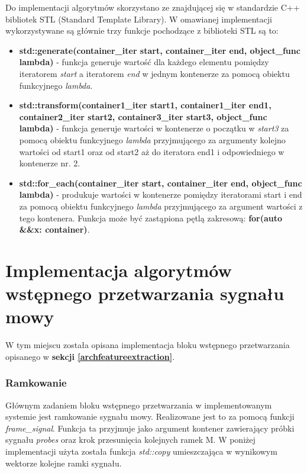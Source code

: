 Do implementacji algorytmów skorzystano ze znajdującej się w standardzie C++ bibliotek STL (Standard Template Library). W omawianej implementacji wykorzystywane są głównie trzy funkcje pochodzące z biblioteki STL są to:
\begin{itemize}
  \item{\textbf{std::generate(container\_iter start, container\_iter end, object\_func lambda)}} - funkcja generuje wartość dla każdego elementu pomiędzy iteratorem \textit{start} a iteratorem \textit{end} w jednym kontenerze za pomocą obiektu funkcyjnego \textit{lambda}.
  \item{\textbf{std::transform(container1\_iter start1, container1\_iter end1,
                       container2\_iter start2,
                       container3\_iter start3, object\_func lambda)}} 
  - funkcja generuje wartości w kontenerze o początku w \textit{start3} za pomocą obiektu funkcyjnego \textit{lambda} przyjmującego za argumenty kolejno wartości od start1 oraz od start2 aż do iteratora end1 i odpowiedniego w kontenerze nr. 2.
  \item{\textbf{std::for\_each(container\_iter start, container\_iter end, object\_func lambda)}} - produkuje wartości w kontenerze pomiędzy iteratorami start i end za pomocą obiektu funkcyjnego \textit{lambda} przyjmującego za argument wartości z tego kontenera. Funkcja może być zastąpiona pętlą zakresową: \textbf{for(auto \&\&x: container)}.

\end{itemize}

\section{Implementacja algorytmów wstępnego przetwarzania  sygnału mowy}

W tym miejscu została opisana implementacja bloku wstępnego przetwarzania opisanego w \textbf{sekcji \ref{archfeatureextraction}}.

\subsubsection{Ramkowanie}

Głównym zadaniem bloku wstępnego przetwarzania w implementowanym systemie jest ramkowanie sygnału mowy. Realizowane jest to za pomocą funkcji \textit{frame\_signal}. Funkcja ta przyjmuje jako argument kontener zawierający próbki sygnału \textit{probes} oraz krok przesunięcia kolejnych ramek M. W poniżej implementacji użyta została funkcja \textit{std::copy} umieszczająca w wynikowym wektorze kolejne ramki sygnału.

